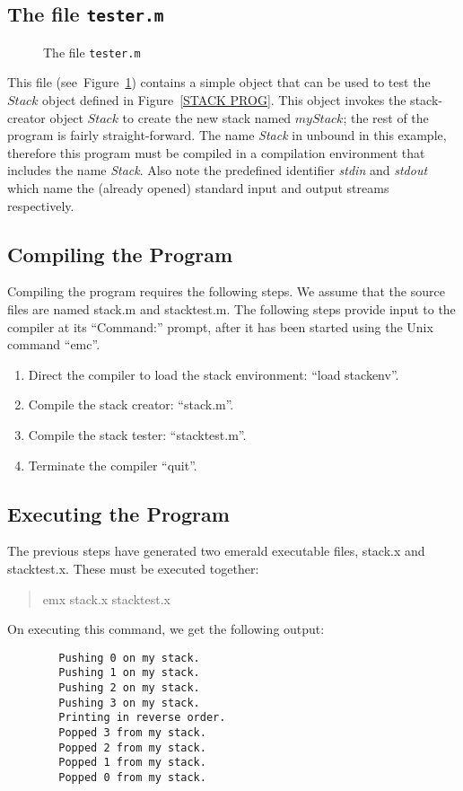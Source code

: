 \subsection*{The file {\tt tester.m}}
\begin{figure}

\caption{The file {\tt tester.m}}
\label{TEST STACK PROG}
\end{figure}
This file (see~Figure~\ref{TEST STACK PROG}) contains a simple object that
can be used to 
test the $Stack$ object defined in Figure~\ref{STACK PROG}.
This object invokes the stack-creator object $Stack$
to create the new stack named $myStack$; the rest of the program is fairly
straight-forward. The name {\it Stack\/} in unbound in this example,
therefore this program must be compiled in a compilation environment that
includes the name {\it Stack\/}.
Also note the predefined identifier {\it stdin\/} and {\it stdout\/} which name
the (already opened) standard input and output streams respectively.

\subsection{Compiling the Program}
\label{compiling program}
Compiling the program requires the following steps.  We assume that the
source files are named stack.m and stacktest.m.  The following steps provide
input to the compiler at its ``Command:'' prompt, after it has been started
using the Unix command ``emc''.
\begin{enumerate}
  \item{} Direct the compiler to load the stack environment:  ``load
    stackenv''.
  \item{} Compile the stack creator: ``stack.m''.
  \item{} Compile the stack tester: ``stacktest.m''.
  \item{} Terminate the compiler ``quit''.
\end{enumerate}
\subsection{Executing the Program}
\label{executing program}
The previous steps have generated two emerald executable files, stack.x and
stacktest.x.  These must be executed together:
\begin{quote}
  emx stack.x stacktest.x
\end{quote}

On executing this command, we get the following output:

\begin{verbatim}
        Pushing 0 on my stack.
        Pushing 1 on my stack.
        Pushing 2 on my stack.
        Pushing 3 on my stack.
        Printing in reverse order.
        Popped 3 from my stack.
        Popped 2 from my stack.
        Popped 1 from my stack.
        Popped 0 from my stack.
\end{verbatim}
